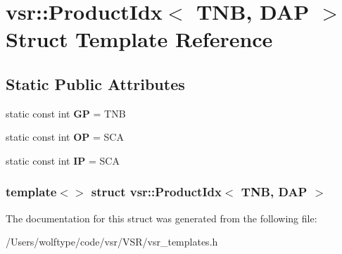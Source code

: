 \hypertarget{structvsr_1_1_product_idx_3_01_t_n_b_00_01_d_a_p_01_4}{\section{vsr\-:\-:Product\-Idx$<$ T\-N\-B, D\-A\-P $>$ Struct Template Reference}
\label{structvsr_1_1_product_idx_3_01_t_n_b_00_01_d_a_p_01_4}
}
\subsection*{Static Public Attributes}
\begin{DoxyCompactItemize}
\item 
\hypertarget{structvsr_1_1_product_idx_3_01_t_n_b_00_01_d_a_p_01_4_a7be0b35795bf2957c49db377151f844e}{static const int {\bfseries G\-P} = T\-N\-B}\label{structvsr_1_1_product_idx_3_01_t_n_b_00_01_d_a_p_01_4_a7be0b35795bf2957c49db377151f844e}

\item 
\hypertarget{structvsr_1_1_product_idx_3_01_t_n_b_00_01_d_a_p_01_4_a640d6094593db0b5a1aafea0e1d64b93}{static const int {\bfseries O\-P} = S\-C\-A}\label{structvsr_1_1_product_idx_3_01_t_n_b_00_01_d_a_p_01_4_a640d6094593db0b5a1aafea0e1d64b93}

\item 
\hypertarget{structvsr_1_1_product_idx_3_01_t_n_b_00_01_d_a_p_01_4_a99d252f0f4a539529be0a9fae4f90024}{static const int {\bfseries I\-P} = S\-C\-A}\label{structvsr_1_1_product_idx_3_01_t_n_b_00_01_d_a_p_01_4_a99d252f0f4a539529be0a9fae4f90024}

\end{DoxyCompactItemize}
\subsubsection*{template$<$$>$ struct vsr\-::\-Product\-Idx$<$ T\-N\-B, D\-A\-P $>$}



The documentation for this struct was generated from the following file\-:\begin{DoxyCompactItemize}
\item 
/\-Users/wolftype/code/vsr/\-V\-S\-R/vsr\-\_\-templates.\-h\end{DoxyCompactItemize}
